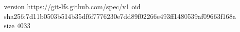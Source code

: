 version https://git-lfs.github.com/spec/v1
oid sha256:7d11b0503b514b35df6f7776230e7dd89f02266e493ff1480539af09663f168a
size 4033
